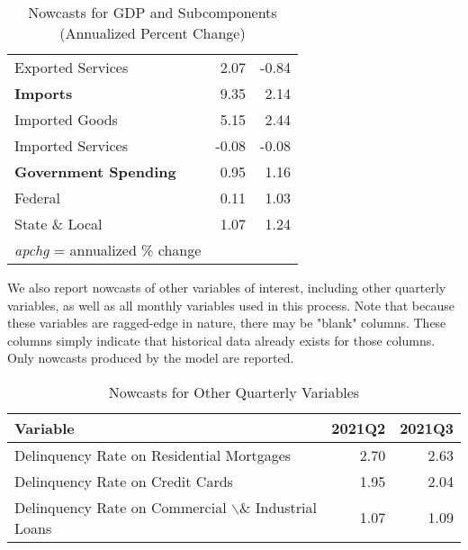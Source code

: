 \documentclass[11pt, letterpaper]{article}\usepackage[]{graphicx}\usepackage[]{color}
\begin{document}
\begin{table}[H]
\begin{tabular}{lrr}
  \hspace{8mm}  Exported Services & 2.07 & -0.84 \\ 
  \hspace{0mm} \textbf{Imports} & 9.35 & 2.14 \\ 
  \hspace{8mm}  Imported Goods & 5.15 & 2.44 \\ 
  \hspace{8mm}  Imported Services & -0.08 & -0.08 \\ 
  \hspace{0mm} \textbf{Government Spending} & 0.95 & 1.16 \\ 
  \hspace{8mm}  Federal & 0.11 & 1.03 \\ 
  \hspace{8mm}  State \& Local & 1.07 & 1.24 \\ 
   \hline 
 \textit{apchg} = annualized \% change 
\end{tabular}
\endgroup
\caption{Nowcasts for GDP and Subcomponents (Annualized Percent Change)} 
\end{table}


We also report nowcasts of other variables of interest, including other quarterly variables, as well as all monthly variables used in this process. Note that because these variables are ragged-edge in nature, there may be "blank" columns. These columns simply indicate that historical data already exists for those columns. Only nowcasts produced by the model are reported.
\begin{table}[H]
\centering
\begingroup\fontsize{11pt}{13pt}\selectfont
\begin{tabular}{lrr}
  \hline
Variable & 2021Q2 & 2021Q3 \\ 
  \hline
Delinquency Rate on Residential Mortgages & 2.70 & 2.63 \\ 
  Delinquency Rate on Credit Cards & 1.95 & 2.04 \\ 
  Delinquency Rate on Commercial $\backslash$\& Industrial Loans & 1.07 & 1.09 \\ 
   \hline
\end{tabular}
\endgroup
\caption{Nowcasts for Other Quarterly Variables} 
\end{table}
\end{document}
